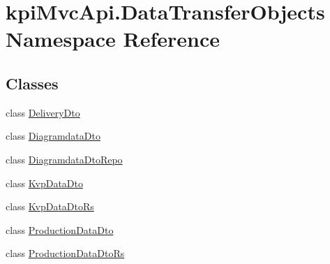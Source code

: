 \hypertarget{namespacekpi_mvc_api_1_1_data_transfer_objects}{}\section{kpi\+Mvc\+Api.\+Data\+Transfer\+Objects Namespace Reference}
\label{namespacekpi_mvc_api_1_1_data_transfer_objects}
\subsection*{Classes}
\begin{DoxyCompactItemize}
\item 
class \hyperlink{classkpi_mvc_api_1_1_data_transfer_objects_1_1_delivery_dto}{Delivery\+Dto}
\item 
class \hyperlink{classkpi_mvc_api_1_1_data_transfer_objects_1_1_diagramdata_dto}{Diagramdata\+Dto}
\item 
class \hyperlink{classkpi_mvc_api_1_1_data_transfer_objects_1_1_diagramdata_dto_repo}{Diagramdata\+Dto\+Repo}
\item 
class \hyperlink{classkpi_mvc_api_1_1_data_transfer_objects_1_1_kvp_data_dto}{Kvp\+Data\+Dto}
\item 
class \hyperlink{classkpi_mvc_api_1_1_data_transfer_objects_1_1_kvp_data_dto_rs}{Kvp\+Data\+Dto\+Rs}
\item 
class \hyperlink{classkpi_mvc_api_1_1_data_transfer_objects_1_1_production_data_dto}{Production\+Data\+Dto}
\item 
class \hyperlink{classkpi_mvc_api_1_1_data_transfer_objects_1_1_production_data_dto_rs}{Production\+Data\+Dto\+Rs}
\end{DoxyCompactItemize}

